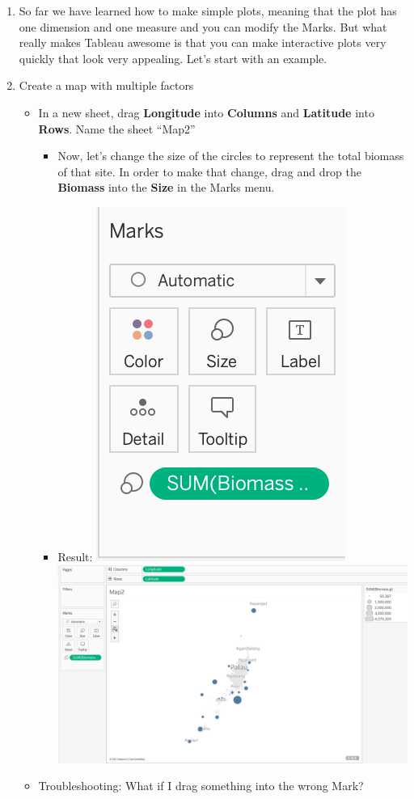 \documentclass[
]{book}
\providecommand{\tightlist}{%
  \setlength{\itemsep}{0pt}\setlength{\parskip}{0pt}}
\begin{document}
\begin{enumerate}
\def\labelenumi{\arabic{enumi}.}
\tightlist
\item
  So far we have learned how to make simple plots, meaning that the plot has one dimension and one measure and you can modify the Marks. But what really makes Tableau awesome is that you can make interactive plots very quickly that look very appealing. Let's start with an example.
\item
  Create a map with multiple factors

  \begin{itemize}
  \tightlist
  \item
    In a new sheet, drag \textbf{Longitude} into \textbf{Columns} and \textbf{Latitude} into \textbf{Rows}. Name the sheet ``Map2''

    \begin{itemize}
    \tightlist
    \item
      Now, let's change the size of the circles to represent the total biomass of that site. In order to make that change, drag and drop the \textbf{Biomass} into the \textbf{Size} in the Marks menu.
    \item
      Result:
      \includegraphics{images/M3S3-Biomass_in_size.png}
      \includegraphics{images/M3S3-map_view_biomass_in_size.png}
    \end{itemize}
  \item
    Troubleshooting: What if I drag something into the wrong Mark?


\end{itemize}
\end{enumerate}
\end{document}
